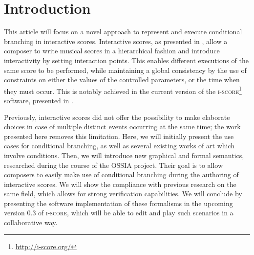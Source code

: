 \documentclass{article}
\title{\papertitle}
\author{
    \bf Jean-Michaël Celerier\\
    Blue Yeti\\
    {\tt \href{mailto:jeanmichael@blueyeti.fr}{jeanmichael@blueyeti.fr}}
    \and
    \bf Pascal Baltazar\\
    L'Arboretum\\
    {\tt \href{mailto:pascal@baltazars.org}{pascal@baltazars.org}}
    \and
    \bf Clément Bossut\\
    LaBRI\\
    {\tt \href{mailto:bossut.clement@gmail.com}{bossut.clement@gmail.com}}
    \and
    \bf Nicolas Vuaille\\
    LaBRI\\
    {\tt \href{mailto:nicolas.vuaille@gmail.com}{nicolas.vuaille@gmail.com}}
    \and
    \bf Jean-Michel Couturier\\
    Blue Yeti\\
    {\tt \href{mailto:jmc@blueyeti.fr}{jmc@blueyeti.fr}}
    \and
    \bf Myriam Desainte-Catherine\\
    LaBRI\\
    {\tt \href{mailto:myriam@labri.fr}{myriam@labri.fr}}
   }
\begin{document}
	\capstartfalse
	\maketitle
	\capstarttrue
	\begin{abstract}
		The theory of interactive scores addresses the writing and execution of temporal constraints between musical objects, with the ability to describe the use of interactivity in the scores. 
		In this paper, a notation for the use of conditional branching in interactive scores will be introduced. It is based on a high level formalism for the authoring of interactive scores developed during the course of the OSSIA research project. This formalism is meant to be at the same time easily manipulated by composers, and translatable to multiple formal methods used in interactive scores like Petri nets and timed automaton. An application programming interface that allows the interactive scores to be embedded in other software and the authoring software, \textsc{i-score}, will be presented.
	\end{abstract}
	
	\section{Introduction}
	This article will focus on a novel approach to represent and execute conditional branching in interactive scores.
	Interactive scores, as presented in \cite{allombert2007system}, allow a composer to write musical scores in a hierarchical fashion and introduce interactivity by setting interaction points. 
	This enables different executions of the same score to be performed, while maintaining a global consistency by the use of constraints on either the values of the controlled parameters, or the time when they must occur.
	This is notably achieved in the current version of the \textsc{i-score}\footnote{\href{http://i-score.org/}{http://i-score.org/}} software, presented in \cite{Baltazar:2014-i-score}.
	
	Previously, interactive scores did not offer the possibility to make elaborate choices in case of multiple distinct events occurring at the same time; the work presented here removes this limitation. Here, we will initially present the use cases for conditional branching, as well as several existing works of art which involve conditions.
	Then, we will introduce new graphical and formal semantics, researched during the course of the OSSIA project. Their goal is to allow composers to easily make use of conditional branching during the authoring of interactive scores. We will show the compliance with previous research on the same field, which allows for strong verification capabilities. 
	We will conclude by presenting the software implementation of these formalisms in the upcoming version 0.3 of \textsc{i-score}, which will be able to edit and play such scenarios in a collaborative way.
	
\end{document}
